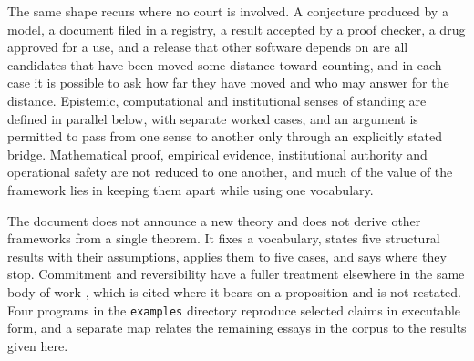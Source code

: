 \documentclass[11pt]{article}
\theoremstyle{remark}
\begin{document}
The same shape recurs where no court is involved. A conjecture produced by a model, a document filed in a registry, a result accepted by a proof checker, a drug approved for a use, and a release that other software depends on are all candidates that have been moved some distance toward counting, and in each case it is possible to ask how far they have moved and who may answer for the distance. Epistemic, computational and institutional senses of standing are defined in parallel below, with separate worked cases, and an argument is permitted to pass from one sense to another only through an explicitly stated bridge. Mathematical proof, empirical evidence, institutional authority and operational safety are not reduced to one another, and much of the value of the framework lies in keeping them apart while using one vocabulary.

The document does not announce a new theory and does not derive other frameworks from a single theorem. It fixes a vocabulary, states five structural results with their assumptions, applies them to five cases, and says where they stop. Commitment and reversibility have a fuller treatment elsewhere in the same body of work \cite{admiss}, which is cited where it bears on a proposition and is not restated. Four programs in the \texttt{examples} directory reproduce selected claims in executable form, and a separate map relates the remaining essays in the corpus to the results given here.






\end{document}
